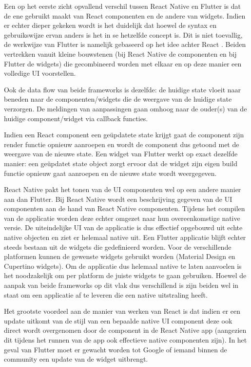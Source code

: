 Een op het eerste zicht opvallend verschil tussen React Native en Flutter is dat de ene gebruikt maakt van React componenten en de andere van widgets. Indien er echter dieper gekeken wordt is het duidelijk dat hoewel de syntax en gebruikswijze ervan anders is het in se hetzelfde concept is. Dit is niet toevallig, de werkwijze van Flutter is namelijk gebaseerd op het idee achter React \autocite{IntroductionToWidgets}. Beiden vertrekken vanuit kleine bouwstenen (bij React Native de componenten en bij Flutter de widgets) die gecombineerd worden met elkaar en op deze manier een volledige UI voorstellen. 

Ook de data flow van beide frameworks is dezelfde: de huidige state vloeit naar beneden naar de componenten/widgets die de weergave van de huidige state verzorgen. De meldingen van aanpassingen gaan omhoog naar de ouder(s) van de huidige component/widget via callback functies.

Indien een React component een geüpdatete state krijgt gaat de component zijn render functie opnieuw aanroepen en wordt de component dus getoond met de weergave van de nieuwe state. Een widget van Flutter werkt op exact dezelfde manier: een geüpdatet state object zorgt ervoor dat de widget zijn eigen build functie opnieuw gaat aanroepen en de nieuwe state wordt weergegeven.

React Native pakt het tonen van de UI componenten wel op een andere manier aan dan Flutter. Bij React Native wordt een beschrijving gegeven van de UI componenten aan de hand van React Native componenten. Tijdens het compilen van de applicatie worden deze echter omgezet naar hun overeenkomstige native versie. De uiteindelijke UI van de applicatie is dus effectief opgebouwd uit echte native objecten en ziet er helemaal native uit. Een Flutter applicatie blijft echter steeds bestaan uit de widgets die gedefinieerd worden. Voor de verschillende platformen kunnen de gewenste widgets gebruikt worden (Material Design en Cupertino widgets). Om de applicatie dus helemaal native te laten aanvoelen is het noodzakelijk om per platform de juiste widgets te gaan gebruiken. Hoewel de aanpak van beide frameworks op dit vlak dus verschillend is zijn beiden wel in staat om een applicatie af te leveren die een native uitstraling heeft.

Het grootste voordeel aan de manier van werken van React is dat indien er een update uitkomt van de stijl van een bepaalde native UI component deze ook direct wordt overgenomen door de component in de React Native app (aangezien dit tijdens het runnen van de app ook effectieve native componenten zijn). In het geval van Flutter moet er gewacht worden tot Google of iemand binnen de community een update van de widget uitbrengt.

